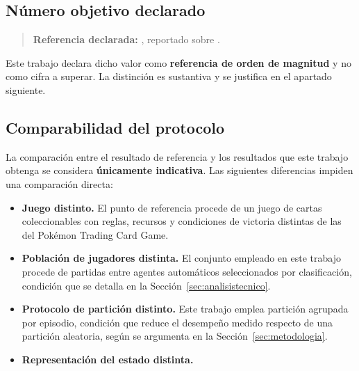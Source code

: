 
\subsection{Número objetivo declarado}
\label{subsec:objetivobaseline}

\begin{quote}
\textbf{Referencia declarada:} , reportado sobre
 \cite{pc}.
\end{quote}

Este trabajo declara dicho valor como \textbf{referencia de orden de
magnitud} y no como cifra a superar. La distinción es sustantiva y se
justifica en el apartado siguiente.


\subsection{Comparabilidad del protocolo}
\label{subsec:comparabilidad}

La comparación entre el resultado de referencia y los resultados que este
trabajo obtenga se considera \textbf{únicamente indicativa}. Las siguientes
diferencias impiden una comparación directa:

\begin{itemize}
  \item \textbf{Juego distinto.} El punto de referencia procede de un juego
        de cartas coleccionables con reglas, recursos y condiciones de
        victoria distintas de las del Pok\'emon Trading Card Game.
  \item \textbf{Población de jugadores distinta.}  El conjunto empleado en este trabajo procede
        de partidas entre agentes automáticos seleccionados por
        clasificación, condición que se detalla en la
        Sección~\ref{sec:analisistecnico}.
  \item \textbf{Protocolo de partición distinto.}  Este trabajo emplea partición agrupada
        por episodio, condición que reduce el desempeño medido respecto de
        una partición aleatoria, según se argumenta en la
        Sección~\ref{sec:metodologia}.
  \item \textbf{Representación del estado distinta.} 
\end{itemize}


